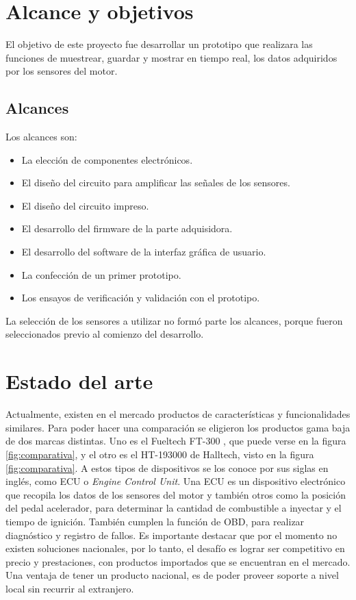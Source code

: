 \section{Alcance y objetivos}

El objetivo de este proyecto fue desarrollar un prototipo que realizara las funciones de muestrear, guardar y mostrar en tiempo real, los datos adquiridos por los sensores del motor.

\subsection{Alcances}

Los alcances son:
\begin{itemize}
\item La elección de componentes electrónicos.
\item El diseño del circuito para amplificar las señales de los sensores.
\item El diseño del circuito impreso.
\item El desarrollo del firmware de la parte adquisidora.
\item El desarrollo del software de la interfaz gráfica de usuario.
\item La confección de un primer prototipo.
\item Los ensayos de verificación y validación con el prototipo.
\end{itemize}

La selección de los sensores a utilizar no formó parte los alcances, porque fueron seleccionados previo al comienzo del desarrollo.

\section{Estado del arte}

Actualmente, existen en el mercado productos de características y funcionalidades similares. Para poder hacer una comparación se eligieron los productos gama baja de dos marcas distintas. Uno es el Fueltech FT-300 \citep{ft-300}, que puede verse en la figura \ref{fig:comparativa},  y el otro es el HT-193000 \citep{ht-193000} de Halltech, visto en la figura \ref{fig:comparativa}. A estos tipos de dispositivos se los conoce por sus siglas en inglés, como ECU o \textit{Engine Control Unit}. Una ECU es un dispositivo electrónico que recopila los datos de los sensores del motor y también otros como la posición del pedal acelerador, para determinar la cantidad de combustible a inyectar y el tiempo de ignición. También cumplen la función de OBD, para realizar diagnóstico y registro de fallos. Es importante destacar que por el momento no existen soluciones nacionales, por lo tanto, el desafío es lograr ser competitivo en precio y prestaciones, con productos importados que se encuentran en el mercado. Una ventaja de tener un producto nacional, es de poder proveer soporte a nivel local sin recurrir al extranjero.


